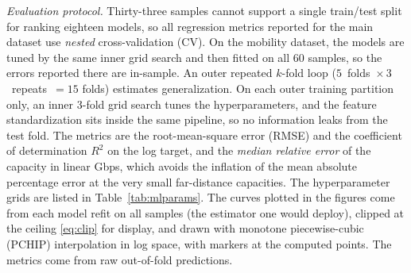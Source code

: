 \documentclass[correspondence]{IEEEtaes}
\begin{document}
\emph{Evaluation protocol.} Thirty-three samples cannot support a single train/test split
for ranking eighteen models, so all regression metrics reported for the main dataset use
\emph{nested} cross-validation (CV). On the mobility dataset, the models are tuned by the
same inner grid search and then fitted on all $60$ samples, so the errors reported there
are in-sample. An outer repeated $k$-fold loop
($5$~folds~$\times\,3$~repeats~$=15$ folds) estimates generalization. On each outer
training partition only, an inner $3$-fold grid search tunes the hyperparameters, and the
feature standardization sits inside the same pipeline, so no information leaks from the
test fold. The metrics are the root-mean-square error (RMSE) and the coefficient of
determination $R^2$ on the log target, and the \emph{median relative error} of the
capacity in linear Gbps, which avoids the inflation of the mean absolute percentage error
at the very small far-distance capacities. The hyperparameter grids are listed in
Table~\ref{tab:mlparams}. The curves plotted in the figures come from each model refit on
all samples (the estimator one would deploy), clipped at the ceiling \eqref{eq:clip} for
display, and drawn with monotone piecewise-cubic (PCHIP) interpolation in log space, with
markers at the computed points. The metrics come from raw out-of-fold predictions.
\end{document}
